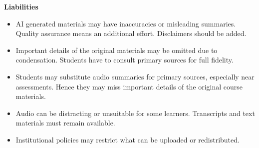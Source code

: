 \noindent\textbf{Liabilities}
\begin{itemize}
    \item[$-$] AI generated materials may have inaccuracies or misleading summaries. Quality assurance means an additional effort. Disclaimers should be added.
    \item[$-$] Important details of the original materials may be omitted due to condensation. Students have to consult primary sources for full fidelity.
    \item[$-$] Students may substitute audio summaries for primary sources, especially near assessments. Hence they may miss important details of the original course materials.
    \item[$-$] Audio can be distracting or unsuitable for some learners. Transcripts and text materials must remain available.
    \item[$-$] Institutional policies may restrict what can be uploaded or redistributed.
\end{itemize}
